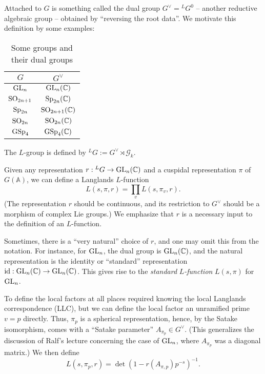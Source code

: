 \documentclass[reqno]{amsart} 
\begin{document}
Attached to $G$ is something called the dual group $G^\vee = {}^L G^0$ -- another reductive algebraic group -- obtained by ``reversing the root data''.  We motivate this definition by some examples:
\begin{table}[h]
  \centering
  \begin{tabular}{|c|c|}
    \hline
    $G$ & $G^\vee$ \\
    \hline
    $\operatorname{GL}_n$ & $\operatorname{GL}_n(\mathbb{C})$ \\
    $\operatorname{SO}_{2n+1}$ & $\operatorname{Sp}_{2n}(\mathbb{C})$ \\
    $\operatorname{Sp}_{2n}$ & $\operatorname{SO}_{2n+1}(\mathbb{C})$ \\
    $\operatorname{SO}_{2n}$ & $\operatorname{SO}_{2n}(\mathbb{C})$ \\
    $\operatorname{GSp}_4$ & $\operatorname{GSp}_4(\mathbb{C})$ \\
    \hline
  \end{tabular}
  \caption{Some groups and their dual groups}
  \label{tab:groups_and_duals}
\end{table}

The $L$-group is defined by ${}^L G := G^\vee \rtimes \mathcal{G}_k$.

Given any representation $r : {}^L G \rightarrow \operatorname{GL}_n(\mathbb{C})$ and a cuspidal representation $\pi$ of $G(\mathbb{A})$, we can define a Langlands $L$-function
\begin{equation*}
  L(s, \pi, r) = \prod_v L(s, \pi_v, r).
\end{equation*}
(The representation $r$ should be continuous, and its restriction to $G^\vee$ should be a morphism of complex Lie groups.)  We emphasize that $r$ is a necessary input to the definition of an $L$-function.

Sometimes, there is a ``very natural'' choice of $r$, and one may omit this from the notation.  For instance, for $\operatorname{GL}_n$, the dual group is $\operatorname{GL}_n(\mathbb{C})$, and the natural representation is the identity or ``standard'' representation $\operatorname{id} : \operatorname{GL}_n(\mathbb{C}) \rightarrow \operatorname{GL}_n(\mathbb{C})$.  This gives rise to the \emph{standard} $L$\emph{-function} $L(s, \pi)$ for $\operatorname{GL}_n$.

To define the local factors at all places required knowing the local Langlands correspondence (LLC), but we can define the local factor an unramified prime $v = p$ directly.  Thus, $\pi_p$ is a spherical representation, hence, by the Satake isomorphism, comes with a ``Satake parameter'' $A_{\pi_p} \in G^\vee$.  (This generalizes the discussion of Ralf's lecture concerning the case of $\operatorname{GL}_n$, where $A_{\pi_p}$ was a diagonal matrix.)  We then define
\begin{equation*}
  L(s, \pi_p, r) = \det \left( 1 - r(A_{\pi,p} ) p^{- s} \right)^{-1}.
\end{equation*}
\end{document}

